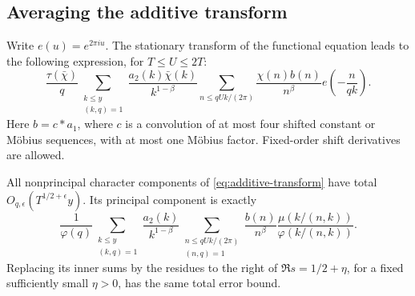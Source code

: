 \subsection{Averaging the additive transform}
Write $e(u)=e^{2\pi iu}$. The stationary transform of the functional
equation leads to the following expression, for $T\le U\le2T$:
\begin{equation}\label{eq:additive-transform}
 \frac{\tau(\bar\chi)}q
 \sum_{\substack{k\le y\\(k,q)=1}}
   \frac{a_2(k)\bar\chi(k)}{k^{1-\beta}}
 \sum_{n\le qUk/(2\pi)}\frac{\chi(n)b(n)}{n^\beta}
                  e\left(-\frac n{qk}\right).
\end{equation}
Here $b=c*a_1$, where $c$ is a convolution of at most four shifted
constant or M\"obius sequences, with at most one M\"obius factor.
Fixed-order shift derivatives are allowed.

\begin{lemma}\label{lem:dirichlet-additive}
All nonprincipal character components of
\eqref{eq:additive-transform} have total
$O_{q,\epsilon}(T^{1/2+\epsilon}y)$. Its principal component is
exactly
\begin{equation}\label{eq:principal-transform}
 \frac1{\varphi(q)}
 \sum_{\substack{k\le y\\(k,q)=1}}\frac{a_2(k)}{k^{1-\beta}}
 \sum_{\substack{n\le qUk/(2\pi)\\(n,q)=1}}
     \frac{b(n)}{n^\beta}
       \frac{\mu(k/(n,k))}{\varphi(k/(n,k))}.
\end{equation}
Replacing its inner sums by the residues to the right of
$\Re s=1/2+\eta$, for a fixed sufficiently small $\eta>0$, has
the same total error bound.
\end{lemma}

